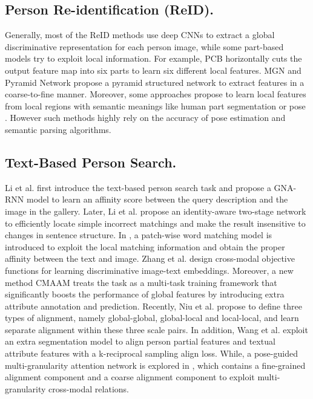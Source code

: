 \documentclass[final]{cvpr}
\begin{document}
\subsection{Person Re-identification (ReID).} 
Generally, most of the ReID methods \cite{hermans2017defense,luo2019bag} use deep CNNs to extract a global discriminative representation for each person image, while some part-based models  \cite{sun2018beyond,wang2018learning,zheng2019pyramidal} try to exploit local information. For example, PCB \cite{sun2018beyond} horizontally cuts the output feature map into six parts to learn six different local features. MGN \cite{wang2018learning} and Pyramid Network \cite{zheng2019pyramidal} propose a pyramid structured network to extract features in a coarse-to-fine manner. Moreover, some approaches propose to learn local features from local regions with semantic meanings like human part segmentation or pose \cite{zheng2019pose,liu2018pose,kalayeh2018human,su2017pose,zhao2017spindle}. However such methods highly rely on the accuracy of pose estimation and semantic parsing algorithms. 

\subsection{Text-Based Person Search.} Li et al. \cite{li2017person} first introduce the text-based person search task and propose a GNA-RNN model to learn an affinity score between the query description and the image in the gallery. 
Later, Li et al. \cite{li2017identity} propose an identity-aware two-stage network to efficiently locate simple incorrect matchings and make the result insensitive to changes in sentence structure. In \cite{chen2018improving}, a patch-wise word matching model is introduced to exploit the local matching information and obtain the proper affinity between the text and image. Zhang et al. \cite{zhang2018deep} design cross-modal objective functions for learning discriminative image-text embeddings. Moreover, a new method CMAAM \cite{aggarwal2020text} treats the task as a multi-task training framework that significantly boosts the performance of global features by introducing extra attribute annotation and prediction. Recently, Niu et al. \cite{niu2020improving} propose to define three types of alignment, namely global-global, global-local and local-local, and learn separate alignment within these three scale pairs. In addition, Wang et al. \cite{wang2020vitaa} exploit an extra segmentation model to align person partial features and textual attribute features with a k-reciprocal sampling align loss. While, a pose-guided multi-granularity attention network is explored in \cite{jing2020pose}, which contains a fine-grained alignment component and a coarse alignment component to exploit multi-granularity cross-modal relations.
\end{document}
